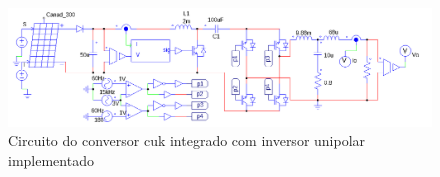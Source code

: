 \documentclass[
	12pt,				%
	openright,			%
	onseside,
	a4paper,			%
	english,			%
	french,				%
	spanish,			%
	brazil,				%
	]{abntex2}
\begin{document}
\begin{anexosenv}
\begin{figure}
	\centering
	\includegraphics[width=\linewidth]{comp_integ_circ_clean_unip}
	\caption{Circuito do conversor cuk integrado com inversor unipolar implementado}	
\end{figure}


\end{anexosenv}
\end{document}
